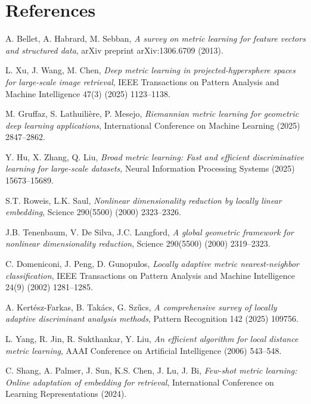 \documentclass[review]{elsarticle}
\begin{document}
\section*{References}


\begin{thebibliography}{99}

A. Bellet, A. Habrard, M. Sebban,
\textit{A survey on metric learning for feature vectors and structured data},
arXiv preprint arXiv:1306.6709 (2013).

L. Xu, J. Wang, M. Chen,
\textit{Deep metric learning in projected-hypersphere spaces for large-scale image retrieval},
IEEE Transactions on Pattern Analysis and Machine Intelligence 47(3) (2025) 1123--1138.

M. Gruffaz, S. Lathuilière, P. Mesejo,
\textit{Riemannian metric learning for geometric deep learning applications},
International Conference on Machine Learning (2025) 2847--2862.

Y. Hu, X. Zhang, Q. Liu,
\textit{Broad metric learning: Fast and efficient discriminative learning for large-scale datasets},
Neural Information Processing Systems (2025) 15673--15689.

S.T. Roweis, L.K. Saul,
\textit{Nonlinear dimensionality reduction by locally linear embedding},
Science 290(5500) (2000) 2323--2326.

J.B. Tenenbaum, V. De Silva, J.C. Langford,
\textit{A global geometric framework for nonlinear dimensionality reduction},
Science 290(5500) (2000) 2319--2323.

C. Domeniconi, J. Peng, D. Gunopulos,
\textit{Locally adaptive metric nearest-neighbor classification},
IEEE Transactions on Pattern Analysis and Machine Intelligence 24(9) (2002) 1281--1285.

A. Kertész-Farkas, B. Takács, G. Szűcs,
\textit{A comprehensive survey of locally adaptive discriminant analysis methods},
Pattern Recognition 142 (2025) 109756.

L. Yang, R. Jin, R. Sukthankar, Y. Liu,
\textit{An efficient algorithm for local distance metric learning},
AAAI Conference on Artificial Intelligence (2006) 543--548.

C. Shang, A. Palmer, J. Sun, K.S. Chen, J. Lu, J. Bi,
\textit{Few-shot metric learning: Online adaptation of embedding for retrieval},
International Conference on Learning Representations (2024).


\end{thebibliography}
\end{document}
